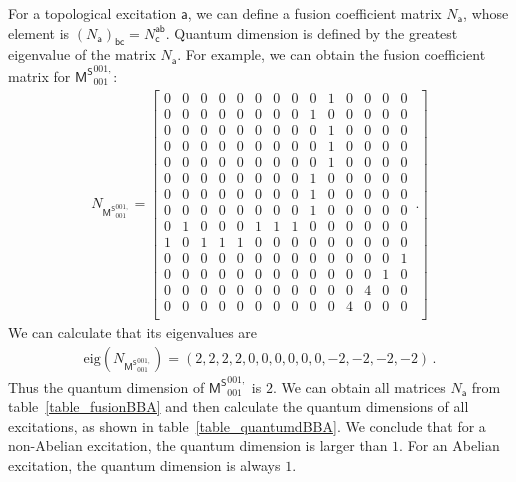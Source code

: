 \documentclass[11pt,nofootinbib,preprint]{revtex4-1}
\begin{document}
For a topological excitation $\mathsf{a}$, we can define a fusion coefficient matrix $N_{\mathsf{a}}$, whose element is $ \left( N_{\mathsf{a}} \right) _{\mathsf{b}\mathsf{c}}=N_{\mathsf{c}}^{\mathsf{a}\mathsf{b}}$. Quantum dimension is defined by the greatest eigenvalue of the matrix $N_{\mathsf{a}}$. For example, we can obtain the fusion coefficient matrix for $\mathsf{M^S}_{001}^{001,}$:
\begin{align}
	N_{\mathsf{M^S}_{001}^{001,}}=\left[\begin{array}{cccccccccccccc}
		0&0&0&0&0&0&0&0&0&1&0&0&0&0\\
		0&0&0&0&0&0&0&0&1&0&0&0&0&0\\
		0&0&0&0&0&0&0&0&0&1&0&0&0&0\\
		0&0&0&0&0&0&0&0&0&1&0&0&0&0\\
		0&0&0&0&0&0&0&0&0&1&0&0&0&0\\
		0&0&0&0&0&0&0&0&1&0&0&0&0&0\\
		0&0&0&0&0&0&0&0&1&0&0&0&0&0\\
		0&0&0&0&0&0&0&0&1&0&0&0&0&0\\
		0&1&0&0&0&1&1&1&0&0&0&0&0&0\\
		1&0&1&1&1&0&0&0&0&0&0&0&0&0\\
		0&0&0&0&0&0&0&0&0&0&0&0&0&1\\
		0&0&0&0&0&0&0&0&0&0&0&0&1&0\\
		0&0&0&0&0&0&0&0&0&0&0&4&0&0\\
		0&0&0&0&0&0&0&0&0&0&4&0&0&0\\
	\end{array}\,.
	\right]
\end{align}
We can calculate that its eigenvalues are 
\begin{align}
	\text{eig}\left(N_{\mathsf{M^S}_{001}^{001,}}\right)=\left(2,2,2,2,0,0,0,0,0,0,-2,-2,-2,-2\right)\,.
\end{align}
Thus the quantum dimension of $\mathsf{M^S}_{001}^{001,}$ is $2$.
We can obtain all matrices $N_{\mathsf{a}}$ from table~\ref{table_fusionBBA} and then calculate the quantum dimensions of all excitations, as shown in table~\ref{table_quantumdBBA}. We conclude that for a non-Abelian excitation, the quantum dimension is larger than $1$. For an Abelian excitation, the quantum dimension is always $1$.
\end{document}
